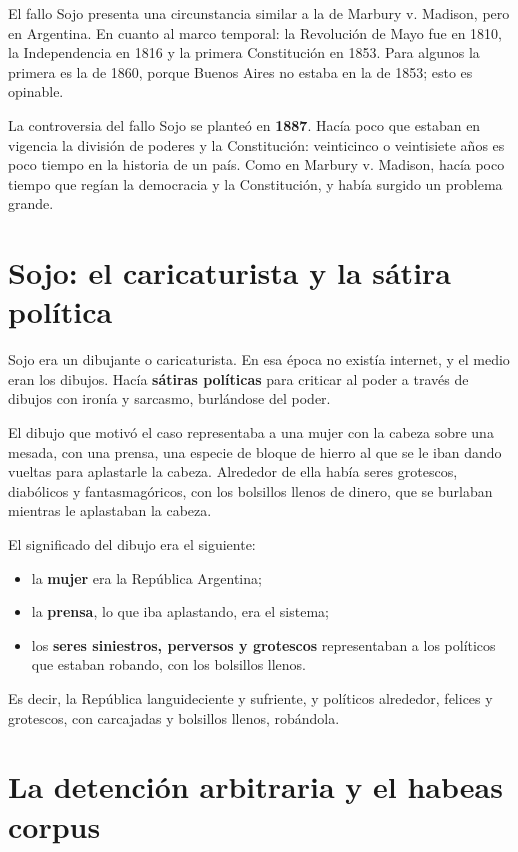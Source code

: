 \documentclass[12pt,oneside,a4paper]{book}
\begin{document}
El fallo Sojo presenta una circunstancia similar a la de Marbury v. Madison, pero en Argentina. En cuanto al marco temporal: la Revolución de Mayo fue en 1810, la Independencia en 1816 y la primera Constitución en 1853. Para algunos la primera es la de 1860, porque Buenos Aires no estaba en la de 1853; esto es opinable.

La controversia del fallo Sojo se planteó en \textbf{1887}. Hacía poco que estaban en vigencia la división de poderes y la Constitución: veinticinco o veintisiete años es poco tiempo en la historia de un país. Como en Marbury v. Madison, hacía poco tiempo que regían la democracia y la Constitución, y había surgido un problema grande.

\section{Sojo: el caricaturista y la sátira política}

Sojo era un dibujante o caricaturista. En esa época no existía internet, y el medio eran los dibujos. Hacía \textbf{sátiras políticas} para criticar al poder a través de dibujos con ironía y sarcasmo, burlándose del poder.

El dibujo que motivó el caso representaba a una mujer con la cabeza sobre una mesada, con una prensa, una especie de bloque de hierro al que se le iban dando vueltas para aplastarle la cabeza. Alrededor de ella había seres grotescos, diabólicos y fantasmagóricos, con los bolsillos llenos de dinero, que se burlaban mientras le aplastaban la cabeza.

El significado del dibujo era el siguiente:
\begin{itemize}
    \item la \textbf{mujer} era la República Argentina;
    \item la \textbf{prensa}, lo que iba aplastando, era el sistema;
    \item los \textbf{seres siniestros, perversos y grotescos} representaban a los políticos que estaban robando, con los bolsillos llenos.
\end{itemize}

Es decir, la República languideciente y sufriente, y políticos alrededor, felices y grotescos, con carcajadas y bolsillos llenos, robándola.

\section{La detención arbitraria y el habeas corpus}
\end{document}
